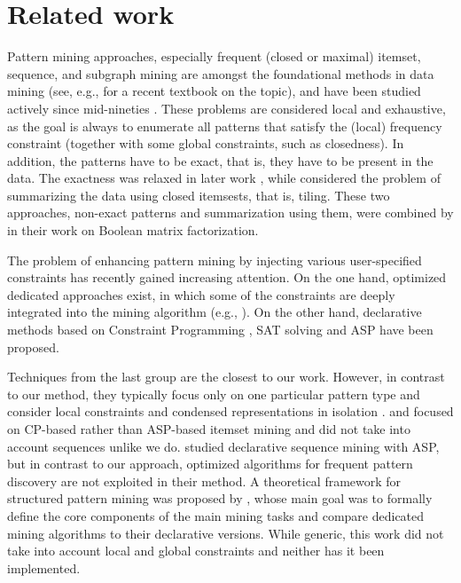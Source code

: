
\section{Related work}\label{sec:relwork}

Pattern mining approaches, especially frequent (closed or maximal) itemset, sequence, and subgraph mining are amongst the foundational methods in data mining (see, e.g., \textcite{aggarwal15data} for a recent textbook on the topic), and have been studied actively since mid-nineties \parencite{agrawal93mining,DBLP:books/mit/fayyadPSU96/AgrawalMSTV96}. These problems are considered local and exhaustive, as the goal is always to enumerate all patterns that satisfy the (local) frequency constraint (together with some global constraints, such as closedness). In addition, the patterns have to be exact, that is, they have to be present in the data. The exactness was relaxed in later work \parencite{pensa05towards}, while \textcite{tiling} considered the problem of summarizing the data using closed itemsests, that is, tiling. These two approaches, non-exact patterns and summarization using them, were combined by \textcite{dbp} in their work on Boolean matrix factorization. 

The problem of enhancing pattern mining by injecting various user-specified constraints has recently gained increasing attention. On the one hand, optimized dedicated approaches exist, in which some of the constraints are deeply integrated into the mining algorithm (e.g., \textcite{DBLP:conf/kdd/PeiH00}).  On the other hand, %
declarative methods based on Constraint Programming \parencite{sky2014,DBLP:conf/cpaior/NegrevergneG15,DBLP:journals/corr/MetivierLC13}, SAT solving \parencite{DBLP:conf/pakdd/JabbourSS15,DBLP:conf/cikm/JabbourSS13} and ASP \parencite{DBLP:conf/lpnmr/Jarvisalo11,DBLP:conf/ijcai/GebserGQ0S16,DBLP:journals/corr/GuyetMQ14} have been proposed. 

Techniques from the last group are the closest to our work. However, in contrast to our method, they typically focus only on one particular pattern type and consider local constraints and condensed representations in isolation \parencite{DBLP:conf/dmkd/PeiHM00,clospan}. %
\textcite{dp2013} and \textcite{DBLP:journals/ai/GunsDNTR17} focused on CP-based rather than ASP-based itemset mining and did not take into account sequences unlike we do. \textcite{DBLP:conf/ijcai/GebserGQ0S16} studied declarative sequence mining with ASP, but in contrast to our approach, optimized algorithms for frequent pattern discovery are not exploited in their method.
A theoretical framework for structured pattern mining was proposed by \textcite{DBLP:conf/aaai/GunsPN16}, whose main goal was to formally define the core components of the main mining tasks and compare dedicated mining algorithms to their declarative versions. While generic, this work did not take into account local and global constraints and neither has it been implemented.

